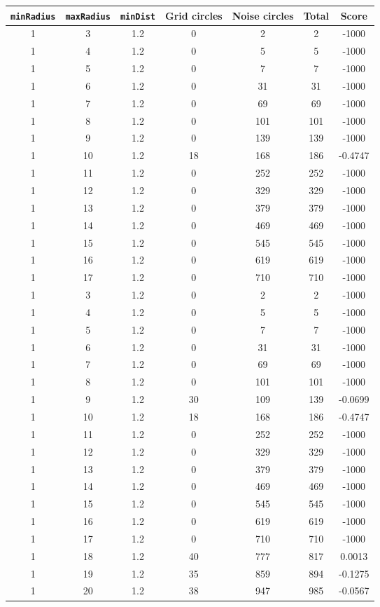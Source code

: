 \documentclass[letterpaper, 12pt]{article}
\begin{document}
\begin{longtable}{|c|c|c|c|c|c|c|}
\hline
\textbf{\texttt{minRadius}} & \textbf{\texttt{maxRadius}} & \textbf{\texttt{minDist}} & \textbf{Grid circles} & \textbf{Noise circles} & \textbf{Total} & \textbf{Score} \\
\hline
1 & 3 & 1.2 & 0 & 2 & 2 & -1000 \\
\hline
1 & 4 & 1.2 & 0 & 5 & 5 & -1000 \\
\hline
1 & 5 & 1.2 & 0 & 7 & 7 & -1000 \\
\hline
1 & 6 & 1.2 & 0 & 31 & 31 & -1000 \\
\hline
1 & 7 & 1.2 & 0 & 69 & 69 & -1000 \\
\hline
1 & 8 & 1.2 & 0 & 101 & 101 & -1000 \\
\hline
1 & 9 & 1.2 & 0 & 139 & 139 & -1000 \\
\hline
1 & 10 & 1.2 & 18 & 168 & 186 & -0.4747 \\
\hline
1 & 11 & 1.2 & 0 & 252 & 252 & -1000 \\
\hline
1 & 12 & 1.2 & 0 & 329 & 329 & -1000 \\
\hline
1 & 13 & 1.2 & 0 & 379 & 379 & -1000 \\
\hline
1 & 14 & 1.2 & 0 & 469 & 469 & -1000 \\
\hline
1 & 15 & 1.2 & 0 & 545 & 545 & -1000 \\
\hline
1 & 16 & 1.2 & 0 & 619 & 619 & -1000 \\
\hline
1 & 17 & 1.2 & 0 & 710 & 710 & -1000 \\
\hline
1 & 3 & 1.2 & 0 & 2 & 2 & -1000 \\
\hline
1 & 4 & 1.2 & 0 & 5 & 5 & -1000 \\
\hline
1 & 5 & 1.2 & 0 & 7 & 7 & -1000 \\
\hline
1 & 6 & 1.2 & 0 & 31 & 31 & -1000 \\
\hline
1 & 7 & 1.2 & 0 & 69 & 69 & -1000 \\
\hline
1 & 8 & 1.2 & 0 & 101 & 101 & -1000 \\
\hline
1 & 9 & 1.2 & 30 & 109 & 139 & -0.0699 \\
\hline
1 & 10 & 1.2 & 18 & 168 & 186 & -0.4747 \\
\hline
1 & 11 & 1.2 & 0 & 252 & 252 & -1000 \\
\hline
1 & 12 & 1.2 & 0 & 329 & 329 & -1000 \\
\hline
1 & 13 & 1.2 & 0 & 379 & 379 & -1000 \\
\hline
1 & 14 & 1.2 & 0 & 469 & 469 & -1000 \\
\hline
1 & 15 & 1.2 & 0 & 545 & 545 & -1000 \\
\hline
1 & 16 & 1.2 & 0 & 619 & 619 & -1000 \\
\hline
1 & 17 & 1.2 & 0 & 710 & 710 & -1000 \\
\hline
1 & 18 & 1.2 & 40 & 777 & 817 & 0.0013 \\
\hline
1 & 19 & 1.2 & 35 & 859 & 894 & -0.1275 \\
\hline
1 & 20 & 1.2 & 38 & 947 & 985 & -0.0567 \\
\hline
\end{longtable}
\end{document}
